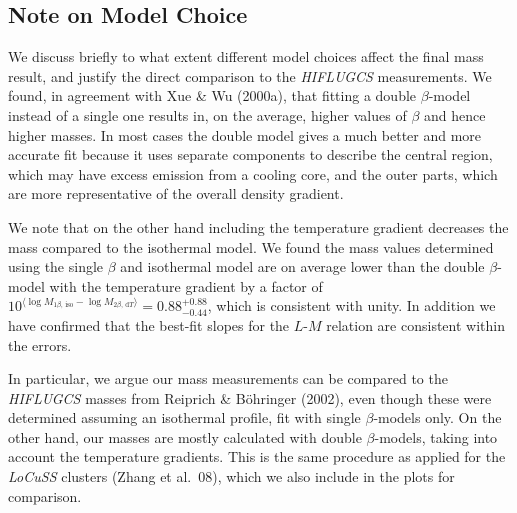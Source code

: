 \documentclass[structabstract]{aa}
\begin{document}
\subsection{Note on Model Choice}\label{sec:modelchoice}
We discuss briefly to what extent different model choices affect the
final mass result, and justify the direct comparison to the
\emph{HIFLUGCS} measurements. We found, in agreement with Xue \& Wu
(2000a), that fitting a double $\beta$-model instead of a single one
results in, on the average, higher values of $\beta$ and hence higher
masses. In most cases the double model gives a much better and more
accurate fit because it uses separate components to describe the
central region, which may have excess emission from a cooling core,
and the outer parts, which are more representative of the overall
density gradient.

We note that on the other hand including the temperature gradient
decreases the mass compared to the isothermal model. We found the mass values
determined using the single $\beta$ and isothermal model are on average lower
than the double $\beta$-model with the temperature gradient by a factor of
$10^{\langle \log M_{1\beta\text{, iso}} - \log M_{2\beta\text{, d}T} \rangle}
=0.88^{+0.88}_{-0.44}$, which is consistent with unity. In addition we have confirmed
that the best-fit slopes for the $L$-$M$ relation are consistent within the
errors.

In particular, we argue our mass measurements can be compared to the
\emph{HIFLUGCS} masses from Reiprich \& B\"ohringer (2002), even
though these were determined assuming an isothermal profile, fit with
single $\beta$-models only. On the other hand, our masses are mostly
calculated with double $\beta$-models, taking into account the
temperature gradients. This is the same procedure as applied for the
\emph{LoCuSS} clusters (Zhang et al.\ 08), which we also include in
the plots for comparison.
%
%
%
\end{document}
